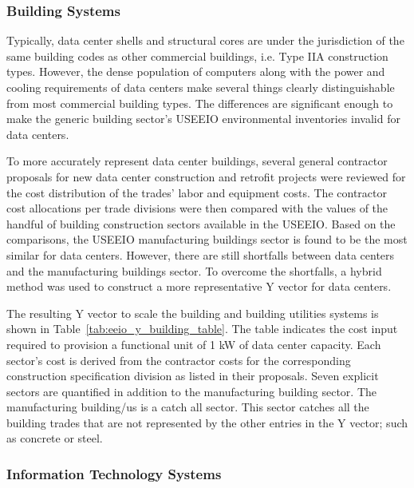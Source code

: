         \subsubsection{Building Systems}
        Typically, data center shells and structural cores are under the jurisdiction of the same building codes as other commercial buildings, i.e. Type IIA construction types. However, the dense population of computers along with the power and cooling requirements of data centers make several things clearly distinguishable from most commercial building types. The differences are significant enough to make the generic building sector's USEEIO environmental inventories invalid for data centers. 
        
        To more accurately represent data center buildings, several general contractor proposals for new data center construction and retrofit projects were reviewed for the cost distribution of the trades' labor and equipment costs.  The contractor cost allocations per trade divisions were then compared with the values of the handful of building construction sectors available in the USEEIO. Based on the comparisons, the USEEIO manufacturing buildings sector is found to be the most similar for data centers. However, there are still shortfalls between data centers and the manufacturing buildings sector. To overcome the shortfalls, a hybrid method was used to construct a more representative Y vector for data centers. 
        
        The resulting Y vector to scale the building and building utilities systems is shown in Table~\ref{tab:eeio_y_building_table}. The table indicates the cost input required to provision a functional unit of 1 kW of data center capacity. Each sector's cost is derived from the contractor costs for the corresponding construction specification division as listed  in their proposals. Seven explicit sectors are quantified in addition to the manufacturing building sector. The manufacturing building/us is a catch all sector. This sector catches all the building trades that are not represented by the other entries in the Y vector; such as concrete or steel. 
        
        
        
        \subsubsection{Information Technology Systems}
        
